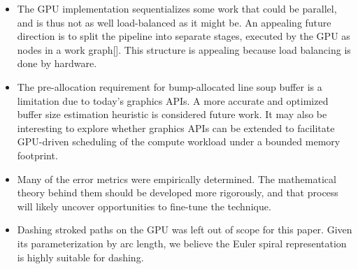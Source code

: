 \documentclass[sigconf]{acmart}
\begin{document}
\begin{itemize}
    \item The GPU implementation sequentializes some work that could be parallel, and is thus not as well load-balanced as it might be. An appealing future direction is to split the pipeline into separate stages, executed by the GPU as nodes in a work graph[]. This structure is appealing because load balancing is done by hardware.

    \item The pre-allocation requirement for bump-allocated line soup buffer is a limitation due to today's graphics APIs. A more accurate and optimized buffer size estimation heuristic is considered future work. It may also be interesting to explore whether graphics APIs can be extended to facilitate GPU-driven scheduling of the compute workload under a bounded memory footprint.

    \item Many of the error metrics were empirically determined. The mathematical theory behind them should be developed more rigorously, and that process will likely uncover opportunities to fine-tune the technique.

    \item Dashing stroked paths on the GPU was left out of scope for this paper. Given its parameterization by arc length, we believe the Euler spiral representation is highly suitable for dashing.
\end{itemize}




\end{document}

